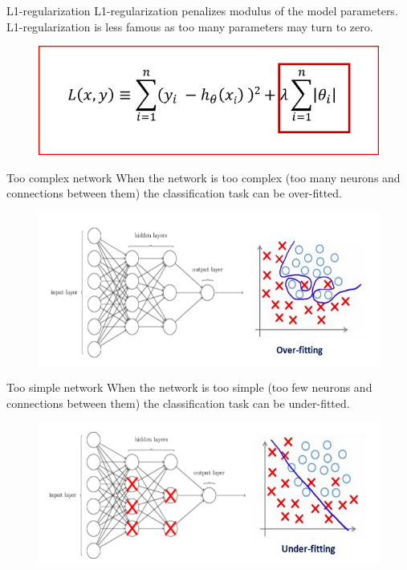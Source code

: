\documentclass[handout]{beamer}
\begin{document}
\begin{frame}{L1-regularization}
    L1-regularization penalizes \alert{modulus} of the model parameters. L1-regularization is less famous as too many parameters may turn to zero.

    \begin{figure}
        \centering
        \includegraphics[width=.8\textwidth]{fig/L2/l1_reg.png}
        
    \end{figure}
\end{frame}


\begin{frame}{Too complex network}
    When the network is too complex (too many neurons and connections between them) the classification task can be over-fitted.

    \begin{figure}
        \centering
        \includegraphics[width=.8\textwidth]{fig/L2/dropout1.png}
        
    \end{figure}
\end{frame}

\begin{frame}{Too simple network}
    When the network is too simple (too few neurons and connections between them) the classification task can be under-fitted.

    \begin{figure}
        \centering
        \includegraphics[width=.8\textwidth]{fig/L2/dropout2.png}
        
    \end{figure}
\end{frame}
\end{document}
